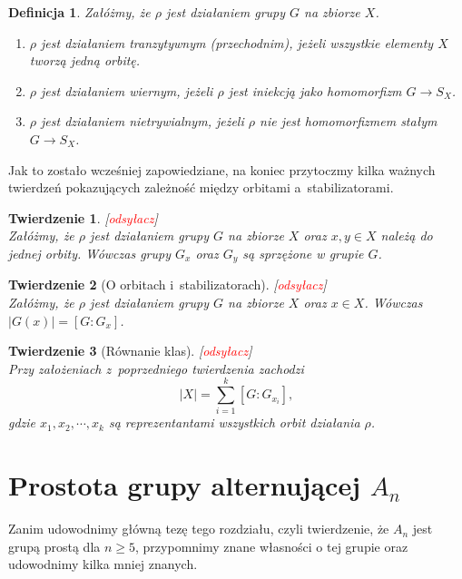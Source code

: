 \documentclass[licencjacka]{pracamgr}
\newtheorem{deff}{Definicja}[section]
\newtheorem{thh}{Twierdzenie}[section]
\begin{document}
\begin{deff}
    Załóżmy, że $\rho$ jest działaniem grupy $G$ na zbiorze $X$.
    \begin{enumerate}[label=\alph*)]
     \item \emph{$\rho$ jest działaniem tranzytywnym (przechodnim)}, jeżeli wszystkie elementy $X$ tworzą jedną orbitę.
     \item \emph{$\rho$ jest działaniem wiernym}, jeżeli $\rho$ jest iniekcją jako homomorfizm $G \to S_X$.
     \item \emph{$\rho$ jest działaniem nietrywialnym}, jeżeli $\rho$ nie jest homomorfizmem stałym $G \to S_X$.
    \end{enumerate}
\end{deff}

Jak to zostało wcześniej zapowiedziane, na koniec przytoczmy kilka
ważnych twierdzeń pokazujących zależność między orbitami
a~stabilizatorami.

\begin{thh}\label{conj_stab} $ $[\textcolor{red}{odsyłacz}]\\
    Załóżmy, że $\rho$ jest działaniem grupy $G$ na zbiorze $X$ oraz $x, y \in X$ należą do jednej orbity.
    Wówczas grupy $G_x$ oraz $G_y$ są sprzężone w grupie $G$.
\end{thh}

\begin{thh}[O orbitach i~stabilizatorach] [\textcolor{red}{odsyłacz}]$ $\\
    Załóżmy, że $\rho$ jest działaniem grupy $G$ na zbiorze $X$ oraz $x\in X$.
    Wówczas $|G(x)| = [G : G_x]$.
\end{thh}

\begin{thh}[Równanie klas] [\textcolor{red}{odsyłacz}] $ $\\
    Przy założeniach z~poprzedniego twierdzenia zachodzi
    $$ |X| = \sum_{i=1}^k [G : G_{x_i}] ,$$
    gdzie $x_1, x_2, \cdots, x_k$ są reprezentantami wszystkich orbit działania $\rho$.
\end{thh}



\chapter{Prostota grupy alternującej $A_n$}

Zanim udowodnimy główną tezę tego rozdziału, czyli twierdzenie, że $A_n$
jest grupą prostą dla $n \ge 5$, przypomnimy znane własności o tej
grupie oraz udowodnimy kilka mniej znanych.
\end{document}
